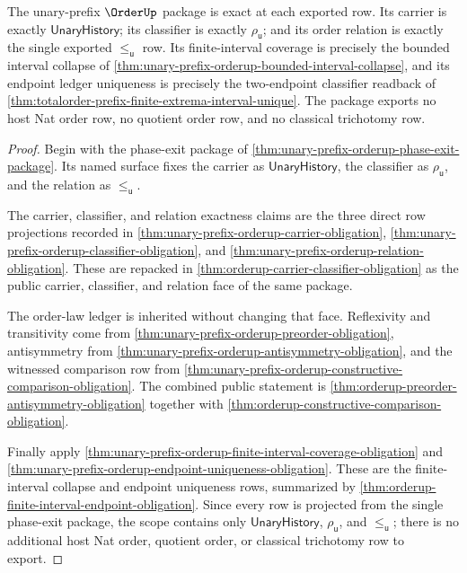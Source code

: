 \begin{theorem}
\label{thm:orderup-exactness-ledger-scope}
The unary-prefix $\OrderUp$ package is exact at each exported row. Its carrier
is exactly $\mathsf{UnaryHistory}$; its classifier is exactly
$\rho_{\mathsf{u}}$; and its order relation is exactly the single exported
$\le_{\mathsf{u}}$ row. Its finite-interval coverage is precisely the bounded
interval collapse of
\autoref{thm:unary-prefix-orderup-bounded-interval-collapse}, and its endpoint
ledger uniqueness is precisely the two-endpoint classifier readback of
\autoref{thm:totalorder-prefix-finite-extrema-interval-unique}. The package
exports no host Nat order row, no quotient order row, and no classical
trichotomy row.
\end{theorem}
\begin{proof}
Begin with the phase-exit package of
\autoref{thm:unary-prefix-orderup-phase-exit-package}. Its named surface fixes
the carrier as $\mathsf{UnaryHistory}$, the classifier as
$\rho_{\mathsf{u}}$, and the relation as $\le_{\mathsf{u}}$.

The carrier, classifier, and relation exactness claims are the three direct
row projections recorded in
\autoref{thm:unary-prefix-orderup-carrier-obligation},
\autoref{thm:unary-prefix-orderup-classifier-obligation}, and
\autoref{thm:unary-prefix-orderup-relation-obligation}. These are repacked in
\autoref{thm:orderup-carrier-classifier-obligation} as the public carrier,
classifier, and relation face of the same package.

The order-law ledger is inherited without changing that face. Reflexivity and
transitivity come from \autoref{thm:unary-prefix-orderup-preorder-obligation},
antisymmetry from
\autoref{thm:unary-prefix-orderup-antisymmetry-obligation}, and the witnessed
comparison row from
\autoref{thm:unary-prefix-orderup-constructive-comparison-obligation}. The
combined public statement is
\autoref{thm:orderup-preorder-antisymmetry-obligation} together with
\autoref{thm:orderup-constructive-comparison-obligation}.

Finally apply
\autoref{thm:unary-prefix-orderup-finite-interval-coverage-obligation} and
\autoref{thm:unary-prefix-orderup-endpoint-uniqueness-obligation}. These are
the finite-interval collapse and endpoint uniqueness rows, summarized by
\autoref{thm:orderup-finite-interval-endpoint-obligation}. Since every row is
projected from the single phase-exit package, the scope contains only
$\mathsf{UnaryHistory}$, $\rho_{\mathsf{u}}$, and $\le_{\mathsf{u}}$; there is
no additional host Nat order, quotient order, or classical trichotomy row to
export.
\end{proof}

